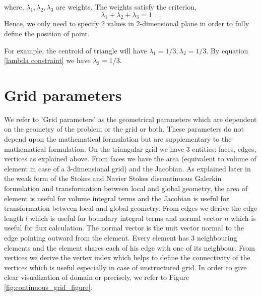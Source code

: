 \documentclass[a4paper]{book}
\begin{document}
where, $\lambda_1, \lambda_2, \lambda_3$ are weights. The weights satisfy the criterion, 
\begin{equation}\label{lambda constraint} 
\lambda_1 + \lambda_2 + \lambda_3 = 1 \quad \textrm{.}
\end{equation}
Hence, we only need to specify 2 values in 2-dimensional plane in order to fully define the position of point.

For example, the centroid of triangle will have $\lambda_1 = 1/3, \lambda_2 = 1/3$. By equation \eqref{lambda constraint} we have $\lambda_3=1/3$.

\section{Grid parameters}

We refer to 'Grid parameters' as the geometrical parameters which are dependent on the geometry of the problem or the grid or both. These parameters do not depend upon the mathematical formulation but are supplementary to the mathematical formulation. On the triangular grid we have 3 entities: faces, edges, vertices as explained above. From faces we have the area (equivalent to volume of element in case of a 3-dimensional grid) and the Jacobian. As explained later in the weak form of the Stokes and Navier Stokes discontinuous Galerkin formulation and transformation between local and global geometry, the area of element is useful for volume integral terms and the Jacobian is useful for transformation between local and global geometry. From edges we derive the edge length $l$ which is useful for boundary integral terms and normal vector $n$ which is useful for flux calculation. The normal vector is the unit vector normal to the edge pointing outward from the element. Every element has 3 neighbouring elements and the element shares each of his edge with one of its neighbour. From vertices we derive the vertex index which helps to define the connectivity of the vertices which is useful especially in case of unstructured grid. In order to give clear visualization of domain or precisely, we refer to Figure \ref{fig:continuous_grid_figure}.
\end{document}
